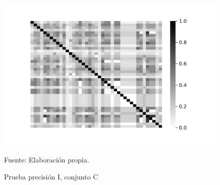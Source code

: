 \begin{figure}[!h]
{\includegraphics[scale=0.41]{images/results/MAP_1588_WIN_W_15_K_5_PRECISION}}
\caption{Prueba precisión I, conjunto C}
Fuente: Elaboración propia.
\label{set_C_precision}
\end{figure}
